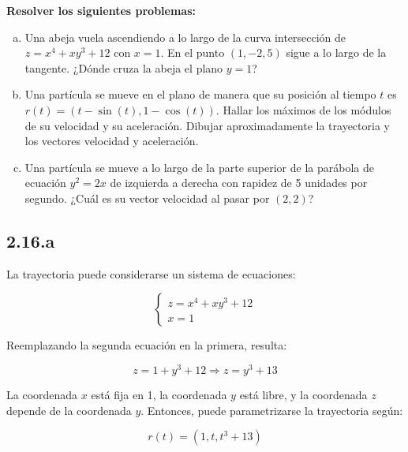 \documentclass{article}
\begin{document}
\textbf{Resolver los siguientes problemas:}

\begin{enumerate}[(a)]
\bfseries

\item Una abeja vuela ascendiendo a lo largo de la curva intersección de $z = x^4 + xy^3 + 12$ con $x = 1$. En el punto $(1, -2, 5)$ sigue a lo largo de la tangente. ¿Dónde cruza la abeja el plano $y = 1$?

\item Una partícula se mueve en el plano de manera que su posición al tiempo $t$ es $r(t) = (t - \sin(t), 1 - \cos(t))$. Hallar los máximos de los módulos de su velocidad y su aceleración. Dibujar aproximadamente la trayectoria y los vectores velocidad y aceleración.

\item Una partícula se mueve a lo largo de la parte superior de la parábola de ecuación $y^2 = 2x$ de izquierda a derecha con rapidez de 5 unidades por segundo. ¿Cuál es su vector velocidad al pasar por $(2,2)$?

\end{enumerate}

\subsection*{2.16.a}
\label{subsec:2.16.a}

La trayectoria puede considerarse un sistema de ecuaciones:

\begin{equation}
\left\{ \begin{array}{ll}
z = x^4 + xy^3 + 12 \\
x = 1
\end{array} \right.
\end{equation}

Reemplazando la segunda ecuación en la primera, resulta:

\begin{equation}
z = 1 + y^3 + 12 \Rightarrow z = y^3 + 13
\end{equation}

La coordenada $x$ está fija en 1, la coordenada $y$ está libre, y la coordenada $z$ depende de la coordenada $y$. Entonces, puede parametrizarse la trayectoria según:

\begin{equation}
r(t) = (1, t, t^3 + 13)
\end{equation}
\end{document}
